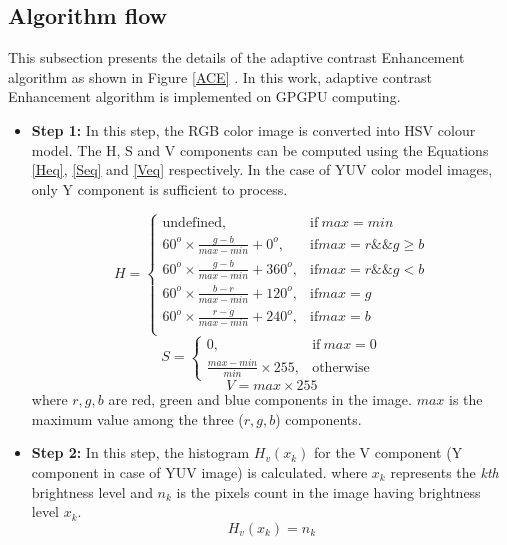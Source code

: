 \subsection{Algorithm flow}
This subsection presents the details of the adaptive contrast Enhancement algorithm as shown in Figure \ref{ACE} . In this work, adaptive contrast Enhancement algorithm is implemented on GPGPU computing. 
\begin{itemize}
\item{\textbf{Step 1:}} In this step, the RGB color image is converted into HSV colour model. The H, S and V components can be computed using the Equations \ref{Heq}, \ref{Seq} and \ref{Veq} respectively. In the case of YUV color model images, only Y component is sufficient to process.
	
	\begin{equation}\label{Heq}
		H=
		\begin{cases}
		\text{undefined}, & \text{if}\ max=min \\
		60^o \times \frac{g-b}{max-min}+0^o, & \text{if} max= r \&\& g\geq b \\
		60^o \times \frac{g-b}{max-min}+360^o, & \text{if} max= r \&\& g < b \\
		60^o \times \frac{b-r}{max-min}+120^o, & \text{if} max= g \\
		60^o \times \frac{r-g}{max-min}+240^o, & \text{if} max= b \\
		\end{cases}
	\end{equation}
	\begin{equation}\label{Seq}
	S=
	\begin{cases}
	0, & \text{if}\ max=0 \\
	\frac{max-min}{min} \times 255, & \text{otherwise}
	\end{cases}
	\end{equation}
	\begin{equation}\label{Veq}
	V = max \times 255	
	\end{equation}
	where $r,g,b$ are red, green and blue components in the image. $max$ is the maximum value among the three ($r,g,b$) components.
	\item{\textbf{Step 2:}} In this step, the histogram $H_v(x_k)$ for the V component (Y component in case of YUV image) is calculated. where $x_k$ represents the \textit{kth} brightness level and $n_k$ is the pixels count in the image having brightness level $x_k$.
	\begin{equation}\label{histeq}
		H_v(x_k)=n_k
	\end{equation}

\end{itemize}
